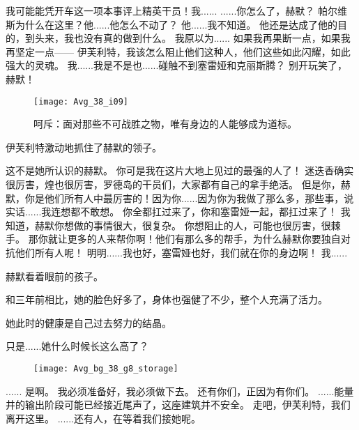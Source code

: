 \documentclass[openany]{book}
\begin{document}
\begin{dialogue}
     我可能能凭开车这一项本事评上精英干员！我......
     ......你怎么了，赫默？
     帕尔维斯为什么在这里？他......他怎么不动了？
     他......我不知道。
     他还是达成了他的目的，到头来，我也没有真的做到什么。
     我原以为......
     如果我再果断一点，如果我再坚定一点——
     伊芙利特，我该怎么阻止他们这种人，他们这些如此闪耀，如此强大的灵魂。
     我......我是不是也......碰触不到塞雷娅和克丽斯腾？
     别开玩笑了，赫默！\par
    \begin{figure}[h]
        \caption*{呵斥：面对那些不可战胜之物，唯有身边的人能够成为道标。}
        \centering
        \texttt{[image: Avg\_38\_i09]}
    \end{figure}
    伊芙利特激动地抓住了赫默的领子。\par
    这不是她所认识的赫默。
     你可是我在这片大地上见过的最强的人了！
     迷迭香确实很厉害，煌也很厉害，罗德岛的干员们，大家都有自己的拿手绝活。
     但是你，赫默，你是他们所有人中最厉害的！因为你......因为你为我做了那么多，那些事，说实话......我连想都不敢想。
     你全都扛过来了，你和塞雷娅一起，都扛过来了！
     我知道，赫默你想做的事情很大，很复杂。
     你想阻止的人，可能也很厉害，很棘手。
     那你就让更多的人来帮你啊！他们有那么多的帮手，为什么赫默你要独自对抗他们所有人呢！
     明明......我也好，塞雷娅也好，我们就在你的身边啊！
     我......\par
    赫默看着眼前的孩子。\par
    和三年前相比，她的脸色好多了，身体也强健了不少，整个人充满了活力。\par
    她此时的健康是自己过去努力的结晶。\par
    只是......她什么时候长这么高了？
    \begin{figure}[h]
        \centering
        \texttt{[image: Avg\_bg\_38\_g8\_storage]}
    \end{figure}
     ......
     是啊。
     我必须准备好，我必须做下去。
     还有你们，正因为有你们。
     ......能量井的输出阶段可能已经接近尾声了，这座建筑并不安全。
     走吧，伊芙利特，我们离开这里。
     ......还有人，在等着我们接她呢。
\end{dialogue}
\end{document}
